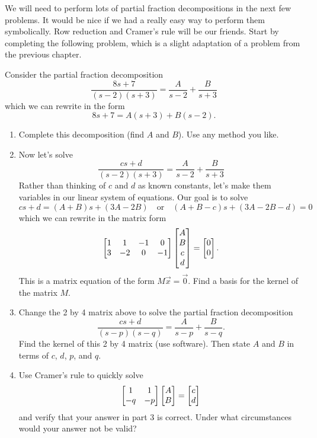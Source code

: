 \mysubsection{\ideaC}


We will need to perform lots of partial fraction decompositions in the next few problems. It would be nice if we had a really easy way to perform them symbolically. Row reduction and Cramer's rule will be our friends. Start by completing the following problem, which is a slight adaptation of a problem from the previous chapter.

\begin{problem}

Consider the partial fraction decomposition 
$$
\frac{8s+7}{(s-2)(s+3)} = \frac{A}{s-2}+\frac{B}{s+3}
$$
which we  can rewrite in the form
$$8s+7 = A(s+3)+B(s-2).$$
\begin{enumerate}
 \item Complete this decomposition (find $A$ and $B$). Use any method you like. 
 \item Now let's solve 
$$
\frac{cs+d}{(s-2)(s+3)} = \frac{A}{s-2}+\frac{B}{s+3}
$$
Rather than thinking of $c$ and $d$ as known constants, let's make them variables in our linear system of equations.  
Our goal is to solve 
$$
cs+d=(A+B)s+(3A-2B)
\quad \text{or}\quad
(A+B-c)s+(3A-2B-d)=0
$$   
which we can rewrite in the matrix form 
%
$$\begin{bmatrix} 
1 & 1 & -1 & 0 \\
3 & -2 & 0 & -1
 \end{bmatrix}\begin{bmatrix} A\\B\\c\\d \end{bmatrix}=\begin{bmatrix} 0\\0 \end{bmatrix}.$$
This is a matrix equation of the form $M\vec x=\vec 0$. Find a basis for the kernel of the matrix $M$.
\item 
Change the 2 by 4 matrix above to solve the partial fraction decomposition
$$
\frac{cs+d}{(s-p)(s-q)} = \frac{A}{s-p}+\frac{B}{s-q}.
$$
Find the kernel of this 2 by 4 matrix (use software). Then state $A$ and $B$ in terms of $c$, $d$, $p$, and $q$. 
\item Use Cramer's rule to quickly solve 
$$\begin{bmatrix} 
1 & 1 \\
-q & -p 
 \end{bmatrix}
\begin{bmatrix} A\\B \end{bmatrix}
=\begin{bmatrix} c\\d \end{bmatrix}$$
and verify that your answer in part 3 is correct.  Under what circumstances would your answer not be valid?
\end{enumerate}
\end{problem}






